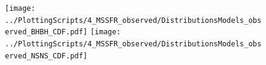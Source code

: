 \documentclass[twocolumn]{aastex63}
\begin{document}
%
%
%
%
%
%
%
%

%
%

%
\begin{figure}
\label{fig:CDFs_BHNS_observed}
    \centering
\texttt{[image: ../PlottingScripts/4\_MSSFR\_observed/DistributionsModels\_observed\_BHBH\_CDF.pdf]} %
\texttt{[image: ../PlottingScripts/4\_MSSFR\_observed/DistributionsModels\_observed\_NSNS\_CDF.pdf]}
    \caption{}%
\end{figure}
%


%
\end{document}
